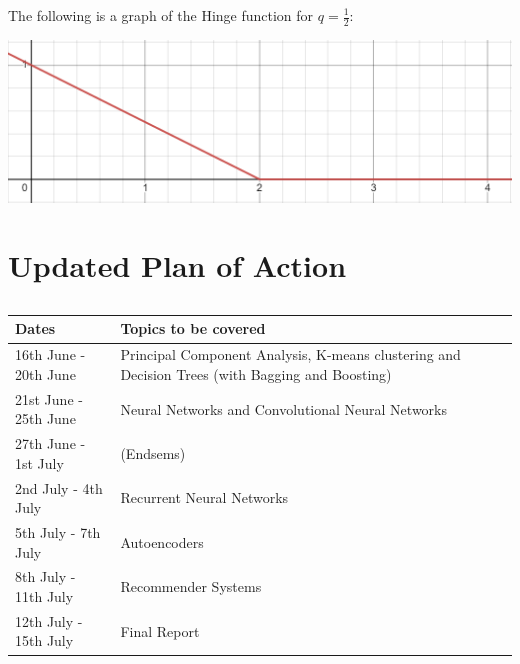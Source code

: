 \documentclass[12 pt]{report}
\begin{document}
    The following is a graph of the Hinge function for $q = \frac{1}{2}$:

    \includegraphics[scale = 0.8]{hinge.png}

    \chapter{Updated Plan of Action}
    \section*{}
    \begin{center}
        \begin{tabularx}{0.8\textwidth}
            {
                |>{\centering\arraybackslash}X 
                |>{\centering\arraybackslash}X
                |>{\centering\arraybackslash}X
            }
            \hline
                \textbf{Dates} & \textbf{Topics to be covered} \\
            \hline
                16th June - 20th June & Principal Component Analysis, K-means clustering and Decision Trees (with Bagging and Boosting) \\
            \hline
                21st June - 25th June & Neural Networks and Convolutional Neural Networks \\
            \hline
                27th June - 1st July & (Endsems) \\
            \hline
                2nd July - 4th July & Recurrent Neural Networks \\
            \hline
                5th July - 7th July & Autoencoders \\
            \hline
                8th July - 11th July & Recommender Systems \\
            \hline
                12th July - 15th July & Final Report \\
            \hline
        \end{tabularx}
    \end{center}
\end{document}
